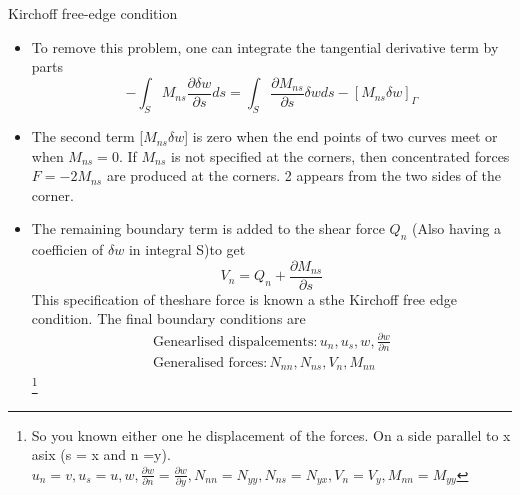 	\begin{frame}{Kirchoff free-edge condition}
		\begin{itemize}
			\item To remove this problem, one can integrate the tangential derivative term by parts
			\begin{equation}
				-\int_S M_{ns}\frac{\partial \delta w}{\partial s} ds = \int_S \frac{\partial M_{ns}}{\partial s}\delta w ds - [M_{ns}\delta w]_{\Gamma}
			\end{equation}
			\item The second term [$M_{ns}\delta w$] is zero when the end points of two curves meet or when $M_{ns} = 0$. If $M_{ns}$ is not specified at the corners, then concentrated forces $F = -2M_{ns}$ are produced at the corners. 2 appears from the two sides of the corner. 
			\item The remaining boundary term is added to the shear force $Q_n$ (Also having a coefficien of $\delta w$ in integral  S)to get
			\begin{equation}
				V_n = Q_n + \frac{\partial M_{ns}}{\partial s}
			\end{equation}
			This specification of theshare force is known a sthe Kirchoff free edge condition. The final boundary conditions are 
			\begin{equation}
			\begin{aligned}
			\text{Genearlised dispalcements} : u_n, u_s,w,\frac{\partial w}{\partial n} \\
			\text{Generalised forces} : N_{nn}, N_{ns}, V_n, M_{nn}
			\end{aligned}
			\end{equation}
			\footnote{So you known either one he displacement of the forces. On a side parallel to x asix (s = x and n =y). $u_n =v, u_s = u, w, \frac{\partial w}{\partial n} = \frac{\partial w}{\partial y}, N_{nn}=N_{yy},N_{ns}=N_{yx}, V_n =V_y,M_{nn}=M_{yy}$}
		\end{itemize}
	\end{frame}


